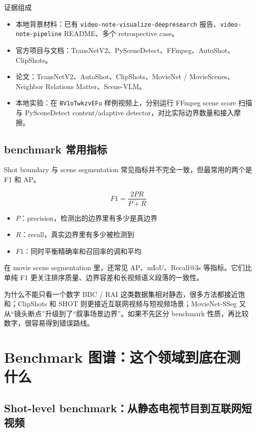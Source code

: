 \documentclass[a4paper]{article}
\begin{document}
\begin{methodbox}{证据组成}
\begin{itemize}
\item 本地背景材料：已有 \texttt{video-note-visualize-deepresearch} 报告、\texttt{video-note-pipeline} README、多个 retrospective case。
\item 官方项目与文档：TransNetV2、PySceneDetect、FFmpeg、AutoShot、ClipShots。
\item 论文：TransNetV2、AutoShot、ClipShots、MovieNet / MovieScenes、Neighbor Relations Matter、Scene-VLM。
\item 本地实验：在 \texttt{BV1oTwkzvEFu} 样例视频上，分别运行 FFmpeg scene score 扫描与 PySceneDetect content/adaptive detector，对比实际边界数量和接入摩擦。
\end{itemize}
\end{methodbox}

\subsection{benchmark 常用指标}

Shot boundary 与 scene segmentation 常见指标并不完全一致，但最常用的两个是 F1 和 AP。

$$
F1 = \frac{2PR}{P + R}
$$

\begin{itemize}
\item $P$：precision，检测出的边界里有多少是真边界
\item $R$：recall，真实边界里有多少被检测到
\item $F1$：同时平衡精确率和召回率的调和平均
\end{itemize}

在 movie scene segmentation 里，还常见 AP、mIoU、Recall@3s 等指标。它们比单纯 F1 更关注排序质量、边界容差和长视频语义段落的一致性。

\begin{evidencebox}{为什么不能只看一个数字}
BBC / RAI 这类数据集相对静态，很多方法都接近饱和；ClipShots 和 SHOT 则更接近互联网视频与短视频场景；MovieNet-SSeg 又从“镜头断点”升级到了“叙事场景边界”。如果不先区分 benchmark 性质，再比较数字，很容易得到错误路线。
\end{evidencebox}

\section{Benchmark 图谱：这个领域到底在测什么}

\subsection{Shot-level benchmark：从静态电视节目到互联网短视频}
\end{document}
